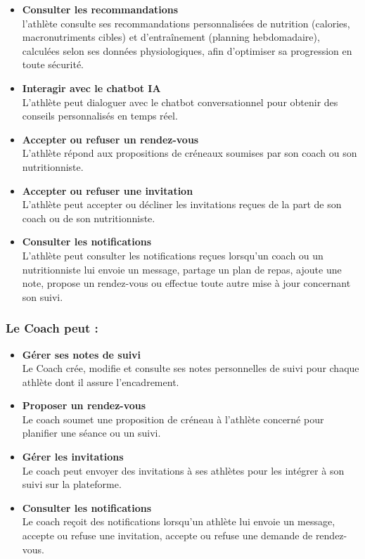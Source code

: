 \documentclass[a4paper,12pt]{report}
\begin{document}
\begin{itemize}
    \item \textbf{Consulter les recommandations} \\
    l'athlète consulte ses recommandations personnalisées de nutrition (calories, macronutriments cibles) et d'entraînement (planning hebdomadaire), calculées selon ses données physiologiques, 
    afin d'optimiser sa progression en toute sécurité.
    \item \textbf{Interagir avec le chatbot IA} \\
    L'athlète peut dialoguer avec le chatbot 
    conversationnel  pour obtenir des conseils personnalisés 
    en temps réel.
    \item \textbf{Accepter ou refuser un rendez-vous} \\
    L'athlète répond aux propositions de 
    créneaux soumises par son coach ou son nutritionniste.
    \item \textbf{Accepter ou refuser une invitation} \\
    L'athlète peut accepter ou décliner 
    les invitations reçues de la part de son coach ou de son nutritionniste.
\item \textbf{Consulter les notifications} \\ 
L'athlète peut consulter les notifications reçues lorsqu'un coach ou un nutritionniste lui envoie un message, partage un plan de repas, ajoute une note, propose un rendez-vous ou effectue toute autre mise à jour concernant son suivi.
\end{itemize}

\subsubsection*{Le Coach peut :}
\begin{itemize}
    
    \item \textbf{Gérer ses notes de suivi} \\
    Le Coach crée, modifie et consulte ses notes 
    personnelles de suivi pour chaque athlète dont il assure l'encadrement.
   
    \item \textbf{Proposer un rendez-vous} \\
    Le coach soumet une proposition de créneau à 
    l'athlète concerné pour planifier une séance ou un suivi.
    \item \textbf{Gérer les invitations} \\
    Le coach peut envoyer des invitations à ses athlètes 
    pour les intégrer à son suivi sur la plateforme.
    \item \textbf{Consulter les notifications} \\
    Le coach reçoit des notifications lorsqu'un athlète lui envoie un message, accepte ou refuse une invitation, accepte ou refuse une demande de rendez-vous.
\end{itemize}
\end{document}
